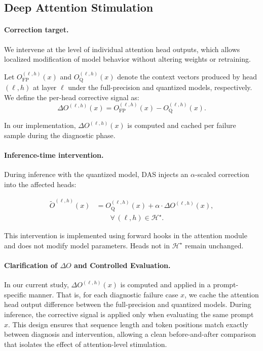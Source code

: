 \subsection{Deep Attention Stimulation}
\label{sec:das}

\paragraph{Correction target.}
We intervene at the level of individual attention head outputs, which allows
localized modification of model behavior without altering weights or retraining.

Let $O^{(\ell,h)}_{\text{FP}}(x)$ and $O^{(\ell,h)}_{\text{Q}}(x)$ denote the
context vectors produced by head $(\ell,h)$ at layer $\ell$ under the
full-precision and quantized models, respectively.
We define the per-head corrective signal as:
\begin{equation}
\Delta O^{(\ell,h)}(x)
=
O^{(\ell,h)}_{\text{FP}}(x)
-
O^{(\ell,h)}_{\text{Q}}(x).
\label{eq:delta_output}
\end{equation}

In our implementation, $\Delta O^{(\ell,h)}(x)$ is computed and cached per failure
sample during the diagnostic phase.

\paragraph{Inference-time intervention.}
During inference with the quantized model, DAS injects an $\alpha$-scaled
correction into the affected heads:

\begin{equation}
\begin{aligned}
\widetilde{O}^{(\ell,h)}(x) &= O^{(\ell,h)}_{\text{Q}}(x) + \alpha \cdot \Delta O^{(\ell,h)}(x), \\
&\qquad \forall\, (\ell,h) \in \mathcal{H}^\star.
\end{aligned}
\label{eq:das}
\end{equation}

This intervention is implemented using forward hooks in the attention module and
does not modify model parameters.
Heads not in $\mathcal{H}^\star$ remain unchanged.

\paragraph{Clarification of $\Delta O$ and Controlled Evaluation.}
In our current study, $\Delta O^{(\ell,h)}(x)$ is computed and applied
in a prompt-specific manner.
That is, for each diagnostic failure case $x$,
we cache the attention head output difference
between the full-precision and quantized models.
During inference, the corrective signal is applied
only when evaluating the same prompt $x$.
This design ensures that sequence length and token positions
match exactly between diagnosis and intervention,
allowing a clean before-and-after comparison
that isolates the effect of attention-level stimulation.

